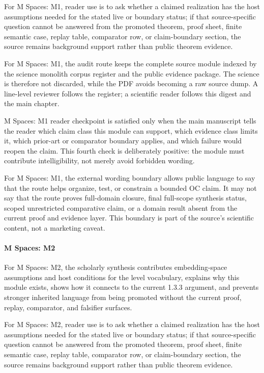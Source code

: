 For M Spaces: M1, reader use is to ask whether a claimed realization has the host assumptions needed for the stated live or boundary status; if that source-specific question cannot be answered from the promoted theorem, proof sheet, finite semantic case, replay table, comparator row, or claim-boundary section, the source remains background support rather than public theorem evidence.


For M Spaces: M1, the audit route keeps the complete source module indexed by the science monolith corpus register and the public evidence package. The science is therefore not discarded, while the PDF avoids becoming a raw source dump. A line-level reviewer follows the register; a scientific reader follows this digest and the main chapter.


M Spaces: M1 reader checkpoint is satisfied only when the main manuscript tells the reader which claim class this module can support, which evidence class limits it, which prior-art or comparator boundary applies, and which failure would reopen the claim. This fourth check is deliberately positive: the module must contribute intelligibility, not merely avoid forbidden wording.


For M Spaces: M1, the external wording boundary allows public language to say that the route helps organize, test, or constrain a bounded OC claim. It may not say that the route proves full-domain closure, final full-scope synthesis status, scoped unrestricted comparative claim, or a domain result absent from the current proof and evidence layer. This boundary is part of the source's scientific content, not a marketing caveat.


\paragraph{M Spaces: M2}

For M Spaces: M2, the scholarly synthesis contributes embedding-space assumptions and host conditions for the level vocabulary, explains why this module exists, shows how it connects to the current 1.3.3 argument, and prevents stronger inherited language from being promoted without the current proof, replay, comparator, and falsifier surfaces.


For M Spaces: M2, reader use is to ask whether a claimed realization has the host assumptions needed for the stated live or boundary status; if that source-specific question cannot be answered from the promoted theorem, proof sheet, finite semantic case, replay table, comparator row, or claim-boundary section, the source remains background support rather than public theorem evidence.



